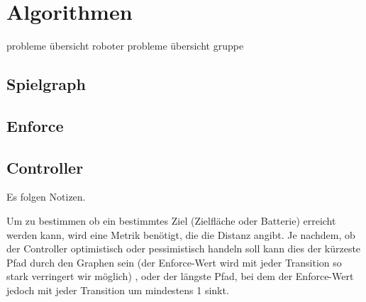 \section{Algorithmen}
probleme übersicht roboter
probleme übersicht gruppe
\subsection{Spielgraph}
\subsection{Enforce}
\subsection{Controller}
Es folgen Notizen.

Um zu bestimmen ob ein bestimmtes Ziel (Zielfläche oder Batterie) erreicht werden kann, wird eine Metrik benötigt,
die die Distanz angibt. Je nachdem, ob der Controller optimistisch oder pessimistisch handeln soll kann dies der kürzeste
Pfad durch den Graphen sein (der Enforce-Wert wird mit jeder Transition so stark verringert wir möglich)
, oder der längste Pfad, bei dem der Enforce-Wert jedoch mit jeder Transition um mindestens 1 sinkt.